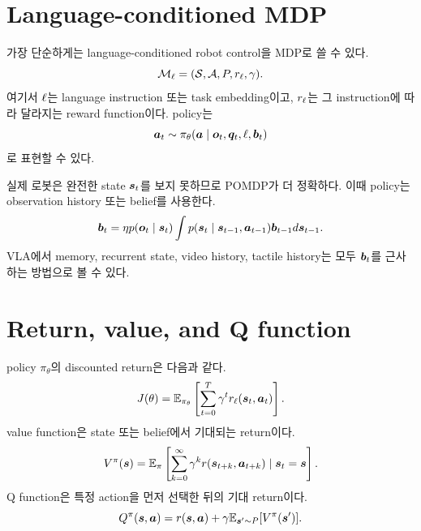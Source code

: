 \section{Language-conditioned MDP}

가장 단순하게는 language-conditioned robot control을 MDP로 쓸 수 있다.
\begin{equation}
  \mathcal{M}_{\ell}
  =
  (\mathcal{S},\mathcal{A},P,r_{\ell},\gamma).
  \label{eq:language-mdp}
\end{equation}
여기서 $\ell$는 language instruction 또는 task embedding이고, $r_{\ell}$는 그 instruction에 따라 달라지는 reward function이다. policy는
\begin{equation}
  \bm{a}_t \sim \pi_{\theta}(\bm{a}\mid \bm{o}_t,\bm{q}_t,\ell,\bm{b}_t)
  \label{eq:language-policy}
\end{equation}
로 표현할 수 있다.

실제 로봇은 완전한 state $\bm{s}_t$를 보지 못하므로 POMDP가 더 정확하다. 이때 policy는 observation history 또는 belief를 사용한다.
\begin{equation}
  \bm{b}_t = \eta p(\bm{o}_t\mid \bm{s}_t)\int p(\bm{s}_t\mid \bm{s}_{t-1},\bm{a}_{t-1})\bm{b}_{t-1}d\bm{s}_{t-1}.
  \label{eq:rl-belief-update}
\end{equation}
VLA에서 memory, recurrent state, video history, tactile history는 모두 $\bm{b}_t$를 근사하는 방법으로 볼 수 있다.

\section{Return, value, and Q function}

policy $\pi_{\theta}$의 discounted return은 다음과 같다.
\begin{equation}
  J(\theta)
  =
  \mathbb{E}_{\pi_{\theta}}
  \left[
  \sum_{t=0}^{T}
  \gamma^{t} r_{\ell}(\bm{s}_t,\bm{a}_t)
  \right].
  \label{eq:rl-return}
\end{equation}
value function은 state 또는 belief에서 기대되는 return이다.
\begin{equation}
  V^{\pi}(\bm{s})
  =
  \mathbb{E}_{\pi}
  \left[
  \sum_{k=0}^{\infty}
  \gamma^{k}r(\bm{s}_{t+k},\bm{a}_{t+k})
  \mid \bm{s}_t=\bm{s}
  \right].
  \label{eq:value-function}
\end{equation}
Q function은 특정 action을 먼저 선택한 뒤의 기대 return이다.
\begin{equation}
  Q^{\pi}(\bm{s},\bm{a})
  =
  r(\bm{s},\bm{a})
  +
  \gamma
  \mathbb{E}_{\bm{s}'\sim P}
  [V^{\pi}(\bm{s}')].
  \label{eq:q-function}
\end{equation}

